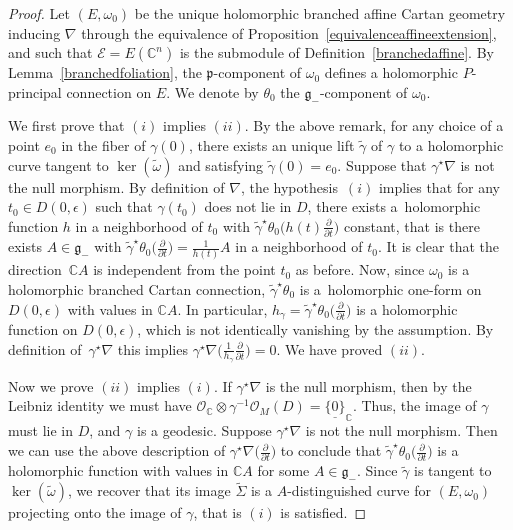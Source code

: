 \documentclass[10pt,a4paper]{amsart}
\newcommand{\der}[2]{\frac{\partial #1}{\partial#2}}
\numberwithin{equation}{section}
\begin{document}
\begin{proof} Let $(E,\omega_0)$ be the unique holomorphic branched affine Cartan geometry inducing $\nabla$ through the equivalence of Proposition~\ref{equivalenceaffineextension}, and such that $\mathcal{E}=E(\mathbb{C}^n)$ is the submodule of Definition~\ref{branchedaffine}. By Lemma~\ref{branchedfoliation}, the $\mathfrak{p}$-component of $\omega_0$ defines a holomorphic $P$-principal connection on $E$. We denote by $\theta_0$ the $\mathfrak{g}_-$-component of $\omega_0$.

 We first prove that $(i)$ implies $(ii)$. By the above remark, for any choice of a point $e_0$ in the fiber of $\gamma(0)$, there exists an unique lift $\tilde{\gamma}$ of $\gamma$ to a holomorphic curve tangent to $\ker(\tilde{\omega})$ and satisfying $\tilde{\gamma}(0)=e_0$. Suppose that $\gamma^\star \nabla$ is not the null morphism. By definition of $\nabla$, the hypothesis~$(i)$ implies that for any $t_0 \in D(0,\epsilon)$ such that $\gamma(t_0)$ does not lie in $D$, there exists a~holomorphic function $h$ in a neighborhood of $t_0$ with $\tilde{\gamma}^\star \theta_0 \big(h(t)\der{}{t}\big)$ constant, that is there exists $A\in \mathfrak{g}_-$ with $\tilde{\gamma}^\star \theta_0\big(\der{}{t}\big) = \frac{1}{h(t)} A$ in a neighborhood of $t_0$. It is clear that the direction~$\mathbb{C}A$ is independent from the point $t_0$ as before. Now, since $\omega_0$ is a holomorphic branched Cartan connection, $\tilde{\gamma}^\star \theta_0$ is a~holomorphic one-form on $D(0,\epsilon)$ with values in $\mathbb{C}A$. In particular, $h_\gamma= \tilde{\gamma}^\star \theta_0\big(\der{}{t}\big)$ is a holomorphic function on $D(0,\epsilon)$, which is not identically vanishing by the assumption. By definition of~$\gamma^\star \nabla$ this implies $\gamma^\star \nabla\big(\frac{1}{h_\gamma}\der{}{t}\big)=0$. We have proved $(ii)$.



Now we prove $(ii)$ implies $(i)$. If $\gamma^\star \nabla$ is the null morphism, then by the Leibniz identity we must have $\mathcal{O}_\mathbb{C} \otimes \gamma^{-1} \mathcal{O}_{M}(D) = \underline{\{0\}}_{\mathbb{C}}$. Thus, the image of $\gamma$ must lie in $D$, and $\gamma$ is a geodesic. Suppose $\gamma^\star \nabla$ is not the null morphism. Then we can use the above description of $\gamma^\star \nabla\big(\der{}{t}\big)$ to conclude that $\tilde{\gamma}^\star \theta_0\big(\der{}{t}\big)$ is a holomorphic function with values in $\mathbb{C}A$ for some $A\in \mathfrak{g}_-$. Since $\tilde{\gamma}$ is tangent to $\ker(\tilde{\omega})$, we recover that its image $\tilde{\Sigma}$ is a $A$-distinguished curve for $(E,\omega_0)$ projecting onto the image of $\gamma$, that is $(i)$ is satisfied.
\end{proof}
\end{document}
